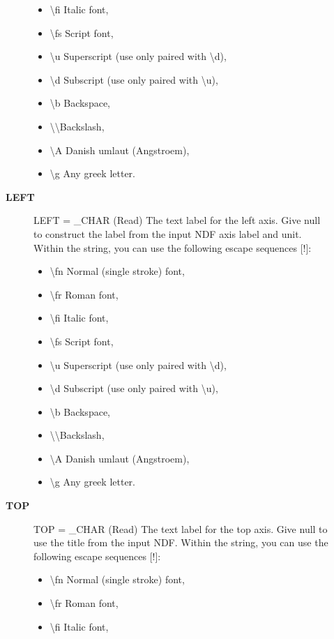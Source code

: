 \begin{description}
\begin{description}
\begin{itemize}
   \item \textbackslash fi Italic font,
   \item \textbackslash fs Script font,
   \item \textbackslash u  Superscript (use only paired with \textbackslash d),
   \item \textbackslash d  Subscript (use only paired with \textbackslash u),
   \item \textbackslash b  Backspace,
   \item \textbackslash \textbackslash   Backslash,
   \item \textbackslash A  Danish umlaut (Angstroem),
   \item \textbackslash g  Any greek letter.
   \end{itemize}
\item [\textbf{LEFT}]
LEFT = \_CHAR (Read)
   The text label for the left axis. Give null to construct the
   label from the input NDF axis label and unit. Within the
   string, you can use the following escape sequences [!]:
   \begin{itemize}
   \item \textbackslash fn Normal (single stroke) font,
   \item \textbackslash fr Roman font,
   \item \textbackslash fi Italic font,
   \item \textbackslash fs Script font,
   \item \textbackslash u  Superscript (use only paired with \textbackslash d),
   \item \textbackslash d  Subscript (use only paired with \textbackslash u),
   \item \textbackslash b  Backspace,
   \item \textbackslash \textbackslash   Backslash,
   \item \textbackslash A  Danish umlaut (Angstroem),
   \item \textbackslash g  Any greek letter.
   \end{itemize}
\item [\textbf{TOP}]
TOP = \_CHAR (Read)
   The text label for the top axis. Give null to use the title
   from the input NDF. Within the string, you can use the
   following escape sequences [!]:
   \begin{itemize}
   \item \textbackslash fn Normal (single stroke) font,
   \item \textbackslash fr Roman font,
   \item \textbackslash fi Italic font,

\end{itemize}
\end{description}
\end{description}

